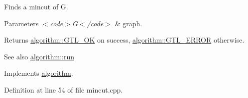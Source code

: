 Finds a mincut of G.


\begin{DoxyParams}{Parameters}
{\em $<$code$>$\+G$<$/code$>$} & graph. \\
\hline
\end{DoxyParams}
\begin{DoxyReturn}{Returns}
{\ttfamily \mbox{\hyperlink{classalgorithm_af1a0078e153aa99c24f9bdf0d97f6710a5114c20e4a96a76b5de9f28bf15e282b}{algorithm\+::\+G\+T\+L\+\_\+\+OK}}} on success, {\ttfamily \mbox{\hyperlink{classalgorithm_af1a0078e153aa99c24f9bdf0d97f6710a6fcf574690bbd6cf710837a169510dd7}{algorithm\+::\+G\+T\+L\+\_\+\+E\+R\+R\+OR}}} otherwise. 
\end{DoxyReturn}
\begin{DoxySeeAlso}{See also}
\mbox{\hyperlink{classalgorithm_a734b189509a8d6b56b65f8ff772d43ca}{algorithm\+::run}} 
\end{DoxySeeAlso}


Implements \mbox{\hyperlink{classalgorithm_a734b189509a8d6b56b65f8ff772d43ca}{algorithm}}.



Definition at line 54 of file mincut.\+cpp.


